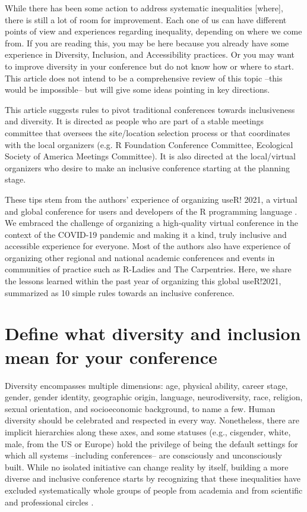 \documentclass[10pt,letterpaper]{article}
\begin{document}
While there has been some action to address systematic inequalities [where], there is still a lot of room for improvement.
Each one of us can have different points of view and experiences regarding inequality, depending on where we come from.
If you are reading this, you may be here because you already have some experience in Diversity, Inclusion, and Accessibility practices. Or you may want to improve diversity in your conference but do not know how or where to start. This article does not intend to be a comprehensive review of this topic --this would be impossible-- but will give some ideas pointing in key directions.   %

This article suggests rules to pivot traditional conferences towards inclusiveness and diversity. It is directed as people who are part of a stable meetings committee that oversees the site/location selection process or that coordinates with the local organizers (e.g. R Foundation Conference Committee, Ecological Society of America Meetings Committee). It is also directed at the local/virtual organizers who desire to make an inclusive conference starting at the planning stage. 

These tips stem from the authors' experience of organizing useR! 2021, a virtual and global conference for users and developers of the R programming language \cite{r_core_team_2021}. We embraced the challenge of organizing a high-quality virtual conference in the context of the COVID-19 pandemic and making it a kind, truly inclusive and accessible experience for everyone. Most of the authors also have experience of organizing other regional and national academic conferences and events in communities of practice such as R-Ladies and The Carpentries. Here, we share the lessons learned within the past year of organizing this global useR!2021, summarized as 10 simple rules towards an inclusive conference.

\section{Define what diversity and inclusion mean for your conference}
\label{rule_diversity}

Diversity encompasses multiple dimensions: age, physical ability, career stage, gender, gender identity,  geographic origin, language, neurodiversity, race, religion, sexual orientation, and socioeconomic background, to name a few. Human diversity should be celebrated and respected in every way. Nonetheless, there are implicit hierarchies along these axes, and some statuses (e.g., cisgender, white, male, from the US or Europe) hold the privilege of being the default settings for which all systems --including conferences-- are consciously and unconsciously built. While no isolated initiative can change reality by itself, building a more diverse and inclusive conference starts by recognizing that these inequalities have excluded systematically whole groups of people from academia and from scientific and professional circles \cite{timperleyHeMoanaPukepuke2020}. 
\end{document}
